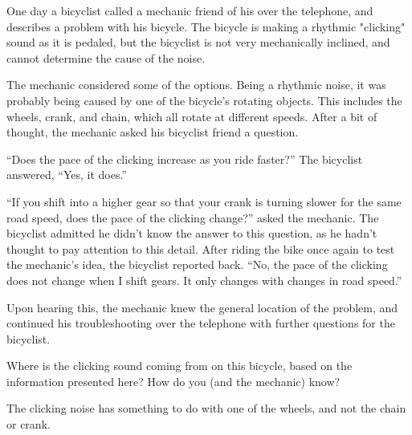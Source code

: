 \vskip 10pt {\narrower \noindent \baselineskip5pt

One day a bicyclist called a mechanic friend of his over the telephone, and describes a problem with his bicycle.  The bicycle is making a rhythmic "clicking" sound as it is pedaled, but the bicyclist is not very mechanically inclined, and cannot determine the cause of the noise. 

\vskip 5pt

The mechanic considered some of the options.  Being a rhythmic noise, it was probably being caused by one of the bicycle's rotating objects.  This includes the wheels, crank, and chain, which all rotate at different speeds.  After a bit of thought, the mechanic asked his bicyclist friend a question.

\vskip 5pt

``Does the pace of the clicking increase as you ride faster?''  The bicyclist answered, ``Yes, it does.''  

\vskip 5pt

``If you shift into a higher gear so that your crank is turning slower for the same road speed, does the pace of the clicking change?'' asked the mechanic.  The bicyclist admitted he didn't know the answer to this question, as he hadn't thought to pay attention to this detail.  After riding the bike once again to test the mechanic's idea, the bicyclist reported back.  ``No, the pace of the clicking does not change when I shift gears.  It only changes with changes in road speed.''

\vskip 5pt

Upon hearing this, the mechanic knew the general location of the problem, and continued his troubleshooting over the telephone with further questions for the bicyclist.

\par} \vskip 10pt

Where is the clicking sound coming from on this bicycle, based on the information presented here?  How do you (and the mechanic) know?







The clicking noise has something to do with one of the wheels, and not the chain or crank.






